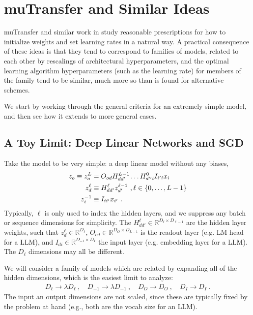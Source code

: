 \section{muTransfer and Similar Ideas}


muTransfer \cite{yang2022tensor} and similar work in \cite{physicalDL,
yaida2022metaprincipledfamilyhyperparameterscaling,doshi2023criticalinitializationwidedeep} study
reasonable prescriptions for how to initialize weights and set learning rates in a natural way. A
practical consequence of these ideas is that they tend to correspond to families of models, related
to each other by rescalings of architectural hyperparameters, and the optimal learning algorithm
hyperparameters (such as the learning rate) for members of the family tend to be similar, much more
so than is found for alternative schemes.

We start by working through the general criteria for an extremely simple model, and then see how it
extends to more general cases.


\subsection{A Toy Limit: Deep Linear Networks and SGD\label{app_mup_toy_limit}}

Take the model to be very simple: a deep linear model without any biases,
\begin{align}
    z _{ o } \equiv  z ^{ L }_{ o } &= O _{ od } H ^{ L-1 }_{ d d' } \ldots H ^{ 0 } _{ d'' i }I _{ i 'i } x _{ i } \nonumber\\
    z ^{ \ell }_{ d } & \equiv H ^{ \ell }_{ d d' } z ^{ \ell-1 }_{ d' }  \ , \ell \in \left \{ 0, \ldots , L-1 \right \}\nonumber\\
    z ^{-1}_{ i } & \equiv I _{ i i' } x _{ i' }  \ . \label{app_eq_deep_linear_model}
\end{align}
Typically, $ \ell $ is only used to index the hidden layers, and we suppress any batch or sequence
dimensions for simplicity. The $ H ^{ \ell } _{ d d' } \in \mathbb{R} ^{ D _{ \ell  } \times D  _{
\ell-1 } } $  are the hidden layer weights, such that $ z_{ d }^{ \ell }\in \mathbb{R}^{ D_{
\ell } } $,  $O _{ o d } \in \mathbb{R} ^{ D _{O}\times D  _{ L-1 } } $ is the readout layer
(e.g. LM head for a LLM), and $I  _{ d i } \in \mathbb{R} ^{ D _{ -1} \times D  _{I} } $ the
input layer (e.g. embedding layer for a LLM). The $ D_{ \ell } $ dimensions may all be different.


We will consider a family of models which are related by expanding all of the hidden dimensions, which is
the easiest limit to analyze:
\begin{align}
    D _{\ell } \longrightarrow   \lambda D _{ \ell }\ ,\quad D _{-1 } \longrightarrow   \lambda D _{-1}\ ,\quad D _{O } \longrightarrow   D _{O}\ ,\quad
    D _{I} \longrightarrow   D _{I}\ . \label{app_eq_mup_width_scaling}
\end{align}
The input an output dimensions are not scaled, since these are typically fixed by the problem at
hand (e.g., both are the vocab size for an LLM).


